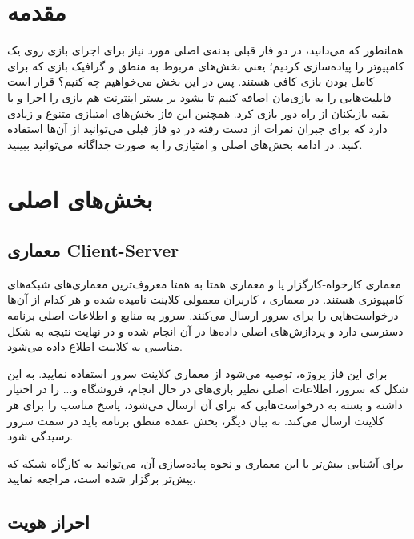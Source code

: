 \documentclass[]{article}
\begin{document}
\newpage

\section*{{\titr مقدمه}}

همانطور که می‌دانید، در دو فاز قبلی بدنه‌ی اصلی مورد نیاز برای اجرای بازی روی یک کامپیوتر را پیاده‌سازی کردیم؛ یعنی بخش‌های مربوط به منطق و گرافیک بازی که برای کامل بودن بازی کافی هستند. پس در این بخش می‌خواهیم چه کنیم؟ قرار است قابلیت‌هایی را به بازی‌مان اضافه کنیم تا بشود بر بستر اینترنت هم بازی را اجرا و با بقیه بازیکنان از راه دور بازی کرد. همچنین این فاز بخش‌های امتیازی متنوع و زیادی دارد که برای جبران نمرات از دست‌ رفته در دو فاز قبلی می‌توانید از آن‌ها استفاده کنید. در ادامه بخش‌های اصلی و امتیازی را به صورت جداگانه می‌توانید ببینید.

\section*{{\titr بخش‌های اصلی}}

\subsection*{{\titr معماری Client-Server}}

معماری کارخواه-کارگزار یا  و معماری همتا به همتا  معروف‌ترین معماری‌های شبکه‌های کامپیوتری هستند. در معماری ، کاربران معمولی کلاینت نامیده شده و هر کدام از آن‌ها درخواست‌هایی را برای سرور ارسال می‌کنند. سرور به منابع و اطلاعات اصلی برنامه دسترسی دارد و پردازش‌های اصلی داده‌ها در آن انجام شده و در نهایت نتیجه به شکل مناسبی به کلاینت اطلاع داده می‌شود.

برای این فاز پروژه، توصیه می‌شود از معماری کلاینت سرور استفاده نمایید. به این شکل که سرور، اطلاعات اصلی نظیر بازی‌های در حال انجام، فروشگاه و... را در اختیار داشته و بسته به درخواست‌هایی که برای آن ارسال می‌شود، پاسخ مناسب را برای هر کلاینت ارسال می‌کند. به بیان دیگر، بخش عمده منطق برنامه باید در سمت سرور رسیدگی شود.

برای آشنایی بیش‌تر با این معماری و نحوه پیاده‌سازی آن، می‌توانید به کارگاه شبکه که پیش‌تر برگزار شده است، مراجعه نمایید.




\subsection*{{\titr احراز هویت}}
\end{document}
